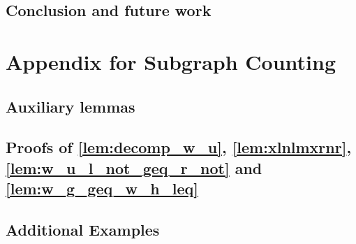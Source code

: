 \documentclass{book}
\begin{document}
\section{Conclusion and future work}
\label{sec:conclusion} 


% 
% 

\chapter{Appendix for Subgraph Counting}
% 
\section*{Auxiliary lemmas}

\section{Proofs of \autoref{lem:decomp_w_u}, \autoref{lem:xlnlmxrnr}, \autoref{lem:w_u_l_not_geq_r_not} and \autoref{lem:w_g_geq_w_h_leq}}
\label{sec:appendix:a}

\section{Additional Examples}

 

\printbibliography
\end{document}
